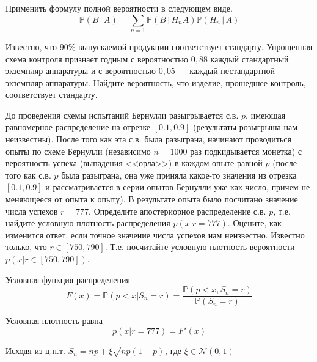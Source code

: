 \begin{ordre}
Применить формулу полной вероятности в следующем виде. 
$$
{\mathbb P}(B\, |\, A)=\sum\limits_{n=1} {\mathbb P}(B\, |\, H_n A){\mathbb P}(H_n\, |\, A)
$$
\end{ordre}

\begin{problem}
Известно, что $90\%$ выпускаемой продукции соответствует стандарту. Упрощенная схема контроля признает 
годным с вероятностью $0,88$ каждый стандартный экземпляр аппаратуры и с вероятностью $0,05$ --- 
каждый нестандартной экземпляр аппаратуры. Найдите вероятность, что изделие, прошедшее контроль, соответствует стандарту. 
\end{problem}


\begin{problem}
До проведения схемы испытаний Бернулли разыгрывается с.в. $p$, имеющая равномерное распределение на отрезке $[0.1, 0.9]$ 
(результаты розыгрыша нам неизвестны). После того как эта с.в. была разыграна, начинают проводиться опыты по схеме Бернулли 
(независимо $n=1000$ раз подкидывается монетка) с вероятность успеха (выпадения <<орла>>) в каждом опыте равной $p$ 
(после того как с.в. $p$ была разыграна, она уже приняла какое-то значения из отрезка $[0.1, 0.9]$ и рассматривается в серии опытов 
Бернулли уже как число, причем не меняющееся от опыта к опыту). В результате опыта было посчитано значение числа успехов $r=777$. 
Определите апостериорное распределение с.в. $p$, т.е. найдите условную плотность распределения $p(x|r=777)$. Оцените, как изменится 
ответ, если точное значение числа успехов нам неизвестно. Известно только, что $r\in[750, 790]$. Т.е. посчитайте условную 
плотность вероятности $p(x|r\in[750, 790])$. 
\end{problem}

\begin{ordre}

Условная функция распределения 
$$
F(x)={\mathbb P}(p<x|S_n=r)=\frac{{\mathbb P}(p<x, S_n=r)}{{\mathbb P}(S_n=r)}
$$

Условная плотность равна 
$$
p(x|r=777)=F'(x) 
$$

Исходя из ц.п.т.  $S_n=np+\xi\sqrt{np(1-p)}$, где $\xi\in {\mathcal N}(0,1)$

\end{ordre}


